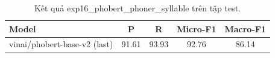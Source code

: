 \begin{table}[t]
\centering
\begin{tabular}{lcccc}
\hline
\textbf{Model} & \textbf{P} & \textbf{R} & \textbf{Micro-F1} & \textbf{Macro-F1} \\
\hline
vinai/phobert-base-v2 (last) & 91.61 & 93.93 & 92.76 & 86.14 \\
\hline
\end{tabular}
\caption{Kết quả exp16_phobert_phoner_syllable trên tập test.}
\label{tab:main}
\end{table}